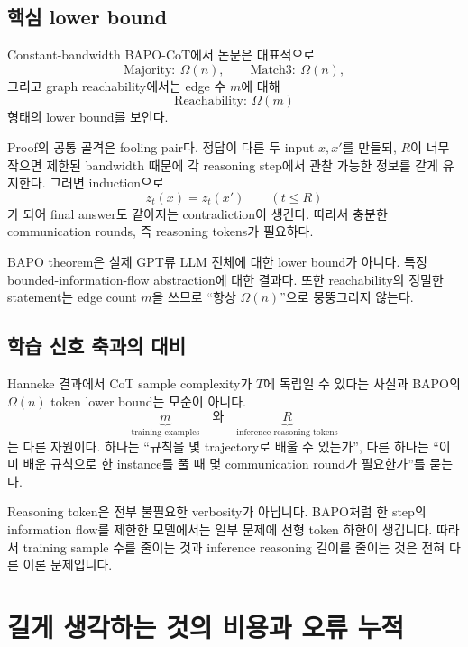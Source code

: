 \documentclass[11pt,a4paper,oneside,openany]{memoir}
\theoremstyle{definition}
\begin{document}
\section{핵심 lower bound}

Constant-bandwidth BAPO-CoT에서 논문은 대표적으로
\[
\mathrm{Majority}:\ \Omega(n),
\qquad
\mathrm{Match3}:\ \Omega(n),
\]
그리고 graph reachability에서는 edge 수 $m$에 대해
\[
\mathrm{Reachability}:\ \Omega(m)
\]
형태의 lower bound를 보인다.

Proof의 공통 골격은 fooling pair다. 정답이 다른 두 input $x,x'$를 만들되, $R$이 너무 작으면 제한된 bandwidth 때문에 각 reasoning step에서 관찰 가능한 정보를 같게 유지한다. 그러면 induction으로
\[
z_t(x)=z_t(x')\qquad (t\le R)
\]
가 되어 final answer도 같아지는 contradiction이 생긴다. 따라서 충분한 communication rounds, 즉 reasoning tokens가 필요하다.

\begin{warningbox}
BAPO theorem은 실제 GPT류 LLM 전체에 대한 lower bound가 아니다. 특정 bounded-information-flow abstraction에 대한 결과다. 또한 reachability의 정밀한 statement는 edge count $m$을 쓰므로 ``항상 $\Omega(n)$''으로 뭉뚱그리지 않는다.
\end{warningbox}

\section{학습 신호 축과의 대비}

Hanneke 결과에서 CoT sample complexity가 $T$에 독립일 수 있다는 사실과 BAPO의 $\Omega(n)$ token lower bound는 모순이 아니다.
\[
\underbrace{m}_{\text{training examples}}
\quad\text{와}\quad
\underbrace{R}_{\text{inference reasoning tokens}}
\]
는 다른 자원이다. 하나는 ``규칙을 몇 trajectory로 배울 수 있는가'', 다른 하나는 ``이미 배운 규칙으로 한 instance를 풀 때 몇 communication round가 필요한가''를 묻는다.

\begin{presentbox}
Reasoning token은 전부 불필요한 verbosity가 아닙니다. BAPO처럼 한 step의 information flow를 제한한 모델에서는 일부 문제에 선형 token 하한이 생깁니다. 따라서 training sample 수를 줄이는 것과 inference reasoning 길이를 줄이는 것은 전혀 다른 이론 문제입니다.
\end{presentbox}

\chapter{길게 생각하는 것의 비용과 오류 누적}
\end{document}
